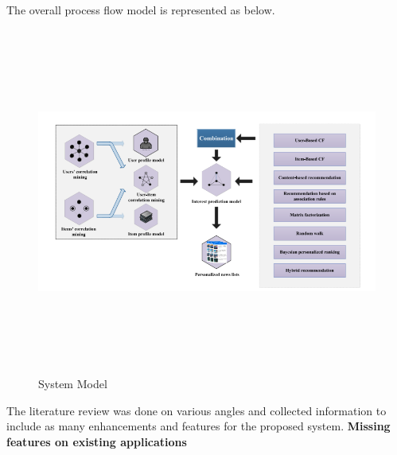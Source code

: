 The overall process flow model is represented as below. 
 \begin{center}
  \begin{figure}[h!]
   \includegraphics[scale=0.7,width=7in,height=4.5in]{images/ProcessFlow.PNG}
    \caption{System Model}
    \end{figure}
    \end{center}

The literature review was done on various angles and collected information to include as many enhancements and features for the proposed system.
\textbf{Missing features on existing applications}

